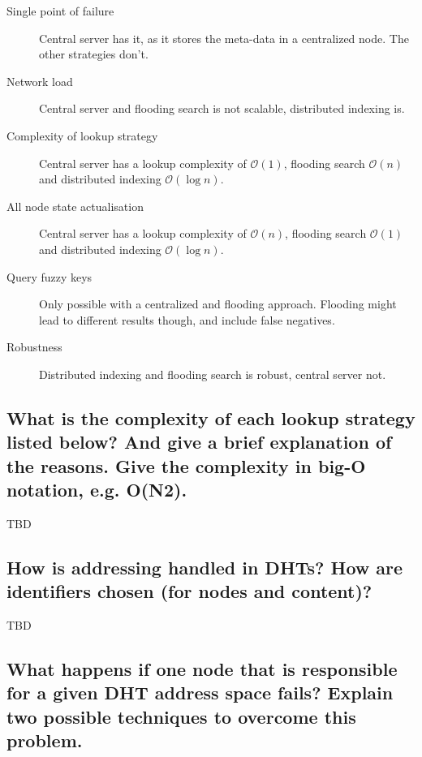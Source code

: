 \documentclass{article}
\begin{document}
\begin{description}
  \item[Single point of failure]

    Central server has it, as it stores the meta-data in a centralized node. The
    other strategies don't.

  \item[Network load]

    Central server and flooding search is not scalable, distributed indexing is.

  \item[Complexity of lookup strategy]

    Central server has a lookup complexity of $\mathcal{O}(1)$, flooding search
    $\mathcal{O}(n)$ and distributed indexing $\mathcal{O}(\log{}n)$.

  \item[All node state actualisation]

    Central server has a lookup complexity of $\mathcal{O}(n)$, flooding search
    $\mathcal{O}(1)$ and distributed indexing $\mathcal{O}(\log{}n)$.

  \item[Query fuzzy keys]

    Only possible with a centralized and flooding approach. Flooding might lead
    to different results though, and include false negatives.

  \item[Robustness]

    Distributed indexing and flooding search is robust, central server not.

\end{description}

\subsection{What is the complexity of each lookup strategy listed below?
And give a brief explanation of the reasons. Give the
complexity in big-O notation, e.g. O(N2).}

TBD

\subsection{How is addressing handled in DHTs? How are identifiers
chosen (for nodes and content)?}

TBD

\subsection{What happens if one node that is responsible for a given
DHT address space fails? Explain two possible techniques to overcome this problem.}
\end{document}
